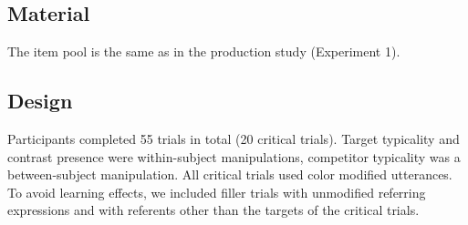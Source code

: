 \documentclass[10pt,letterpaper]{article}
\begin{document}



\subsection{Material}
The item pool is the same as in the production study (Experiment 1).


\subsection{Design}

Participants completed 55 trials in total (20 critical trials). Target typicality and contrast presence were within-subject manipulations, competitor typicality was a between-subject manipulation. All critical trials used color modified utterances. 
To avoid learning effects, we included filler trials with unmodified referring expressions and with referents other than the targets of the critical trials. 
\end{document}
